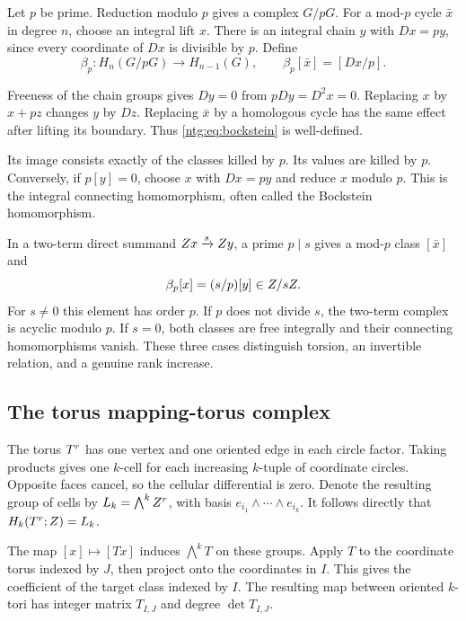Let $p$ be prime. Reduction modulo $p$ gives a complex $G/pG$.
For a mod-$p$ cycle $\bar x$ in degree $n$, choose an integral lift
$x$. There is an integral chain $y$ with $Dx=py$, since every
coordinate of $Dx$ is divisible by $p$. Define
\begin{equation}\label{ntg:eq:bockstein}
 \beta_p:H_n(G/pG)\longrightarrow H_{n-1}(G),\qquad
 \beta_p[\bar x]=[Dx/p].
\end{equation}

Freeness of the chain groups gives $Dy=0$ from $pDy=D^2x=0$.
Replacing $x$ by $x+pz$ changes $y$ by $Dz$. Replacing $\bar x$
by a homologous cycle has the same effect after lifting its boundary.
Thus \eqref{ntg:eq:bockstein} is well-defined.

Its image consists exactly of the classes killed by $p$.
Its values are killed by $p$.
Conversely, if $p[y]=0$, choose $x$ with $Dx=py$ and reduce $x$ modulo $p$.
This is the integral connecting homomorphism, often called the
Bockstein homomorphism.

In a two-term direct summand $Z x\xrightarrow{s}Z y$, a prime
$p\mid s$ gives a mod-$p$ class $[\bar x]$ and
\begin{equation}\label{ntg:eq:beta-factor}
 \beta_p[x]=(s/p)[y]\in Z/sZ.
\end{equation}
For $s\ne0$ this element has order $p$. If $p$ does not divide $s$,
the two-term complex is acyclic modulo $p$. If $s=0$, both classes
are free integrally and their connecting homomorphisms vanish. These
three cases distinguish torsion, an invertible relation, and a genuine
rank increase.

\subsection{The torus mapping-torus complex}\label{ntg:sec:torus}

The torus $T^r$ has one vertex and one oriented edge in each circle
factor. Taking products gives one $k$-cell for each increasing
$k$-tuple of coordinate circles. Opposite faces cancel, so the
cellular differential is zero. Denote the resulting group of cells by
$L_k=\bigwedge^kZ^r$, with basis
$e_{i_1}\wedge\cdots\wedge e_{i_k}$. It follows directly that
$H_k(T^r;Z)=L_k$.

The map $[x]\mapsto[Tx]$ induces $\bigwedge^kT$ on these groups.
Apply $T$ to the coordinate torus indexed by $J$, then project onto
the coordinates in $I$.
This gives the coefficient of the target class indexed by $I$.
The resulting map between oriented $k$-tori has
integer matrix $T_{I,J}$ and degree $\det T_{I,J}$.

